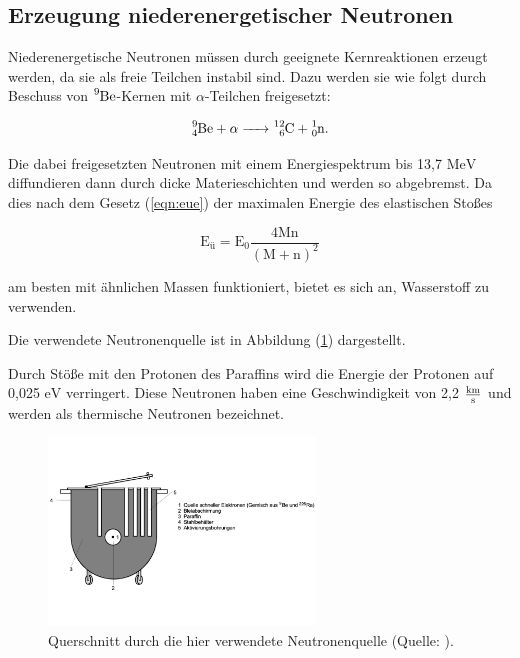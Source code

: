 \subsection{Erzeugung niederenergetischer Neutronen}

\noindent
Niederenergetische Neutronen müssen durch geeignete Kernreaktionen erzeugt werden, da sie als freie Teilchen instabil sind.
Dazu werden sie wie folgt durch Beschuss von $\ce{^9Be}$-Kernen mit $\alpha$-Teilchen freigesetzt:

\begin{equation*}
\ce{^9_4Be +} \alpha \ce{-> ^{12}_6C + ^1_0n}.
\end{equation*}

\noindent
Die dabei freigesetzten Neutronen mit einem Energiespektrum bis 13,7 $\si{\mega\electronvolt}$ diffundieren dann durch dicke Materieschichten und werden so abgebremst.
Da dies nach dem Gesetz (\ref{eqn:eue}) der maximalen Energie des elastischen Stoßes

\begin{equation}
\text{E}_\text{ü} = \text{E}_0 \frac{4\text{Mn}}{(\text{M} + \text{n})^2}
\label{eqn:eue}
\end{equation}

\noindent
am besten mit ähnlichen Massen funktioniert, bietet es sich an,
Wasserstoff zu verwenden.

\noindent 
Die verwendete Neutronenquelle ist in Abbildung (\ref{fig:nq}) dargestellt.

\noindent
Durch Stöße mit den Protonen des Paraffins wird die Energie der Protonen auf 0,025 $\si{\electronvolt}$ verringert.
Diese Neutronen haben eine Geschwindigkeit von 2,2 $\si[per-mode=fraction]{\kilo\meter\per\second}$ und werden als thermische Neutronen bezeichnet.

\begin{figure}
            \centering
               \includegraphics[height=5cm]{neutronenquelle.pdf}
               \caption{Querschnitt durch die hier verwendete Neutronenquelle (Quelle: \cite{V702}).}
               \label{fig:nq}
\end{figure}

